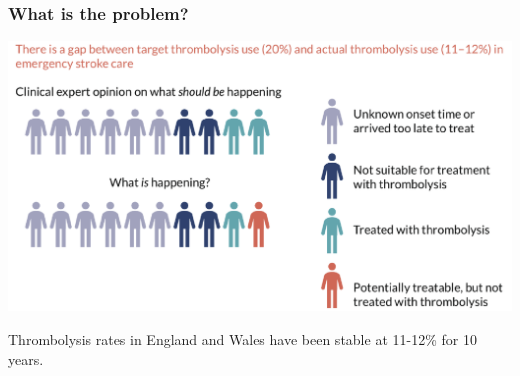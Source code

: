 \documentclass[xcolor={usenames,dvipsnames}]{beamer}
\begin{document}

\begin{frame}
\frametitle{What is the problem?}

\begin{center}
\includegraphics[width=1.0\textwidth]{./images/sam_summary_pt_1}
\end{center}

 
\footnotesize{Thrombolysis rates in England and Wales have been stable at 11-12\% for 10 years.}%



\end{frame}




\end{document}
